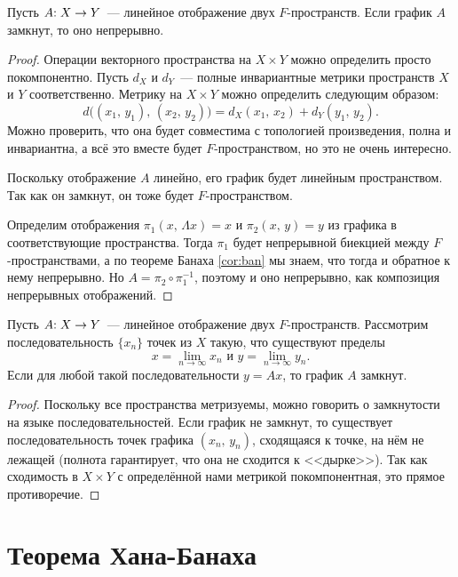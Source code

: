 \documentclass{notes}
\begin{document}
	\begin{thm}
		Пусть $A\text{\text{:}} \; X \to Y$~--- линейное отображение двух $F$-пространств. Если график $A$ замкнут, то оно непрерывно.
		\begin{proof}
			Операции векторного пространства на $X \times Y$ можно определить просто покомпонентно. Пусть $d_X$ и $d_Y$~--- полные инвариантные метрики пространств $X$ и $Y$ соответственно. Метрику на $X \times Y$ можно определить следующим образом:
			\[
				d\big((x_1, \, y_1), \, (x_2, \, y_2)\big) = d_X(x_1, \, x_2) + d_Y(y_1, \, y_2).
			\]
			Можно проверить, что она будет совместима с топологией произведения, полна и инвариантна, а всё это вместе будет $F$-пространством, но это не очень интересно.

			Поскольку отображение $A$ линейно, его график будет линейным пространством. Так как он замкнут, он тоже будет $F$-пространством.

			Определим отображения $\pi_1(x, \, \Lambda x) = x$ и $\pi_2(x, \, y) = y$ из графика в соответствующие пространства. Тогда $\pi_1$ будет непрерывной биекцией между $F$-пространствами, а по теореме Банаха \ref{cor:ban} мы знаем, что тогда и обратное к нему непрерывно. Но $A = \pi_2 \circ \pi_1^{-1}$, поэтому и оно непрерывно, как композиция непрерывных отображений.
		\end{proof}
	\end{thm}

	\begin{st}
		Пусть $A\text{\text{:}} \; X \to Y$~--- линейное отображение двух $F$-пространств. Рассмотрим последовательность $\{x_n\}$ точек из $X$ такую, что существуют пределы
		\[
			x = \lim\limits_{n \to \infty} x_n \text{ и } y = \lim\limits_{n \to \infty} y_n.
		\]
		Если для любой такой последовательности $y = Ax$, то график $A$ замкнут.
		\begin{proof}
			Поскольку все пространства метризуемы, можно говорить о замкнутости на языке последовательностей. Если график не замкнут, то существует последовательность точек графика $(x_n, \, y_n)$, сходящаяся к точке, на нём не лежащей (полнота гарантирует, что она не сходится к <<дырке>>). Так как сходимость в $X \times Y$ с определённой нами метрикой покомпонентная, это прямое противоречие.			
		\end{proof}
	\end{st}

\section{Теорема Хана-Банаха}
	
\end{document}
